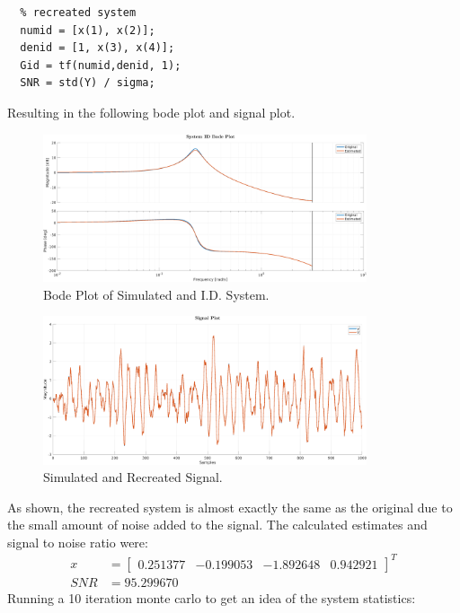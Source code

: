\documentclass[11pt]{article}
\begin{document}
\begin{enumerate}[label=\textbf{\arabic*.}]
\begin{lstlisting}
  % recreated system
  numid = [x(1), x(2)];
  denid = [1, x(3), x(4)];
  Gid = tf(numid,denid, 1);
  SNR = std(Y) / sigma;
  \end{lstlisting}
  Resulting in the following bode plot and signal plot.
  \begin{figure}[H]
    \centering
    \includegraphics[width=0.85\textwidth]{4b.png}
    \caption{Bode Plot of Simulated and I.D. System.}
  \end{figure}
  \begin{figure}[H]
    \centering
    \includegraphics[width=0.85\textwidth]{4b-1.png}
    \caption{Simulated and Recreated Signal.}
  \end{figure}
  As shown, the recreated system is almost exactly the same as the original due 
  to the small amount of noise added to the signal. The calculated estimates and 
  signal to noise ratio were:
  \begin{equation*}
    \begin{split}
      x &= \begin{bmatrix} 0.251377 & -0.199053 & -1.892648 & 0.942921 \end{bmatrix}^T \\
      SNR &= 95.299670
    \end{split}
  \end{equation*}
  Running a 10 iteration monte carlo to get an idea of the system statistics:
  \begin{equation*}
    \begin{split}

\end{split}
\end{equation*}
\end{enumerate}
\end{document}
